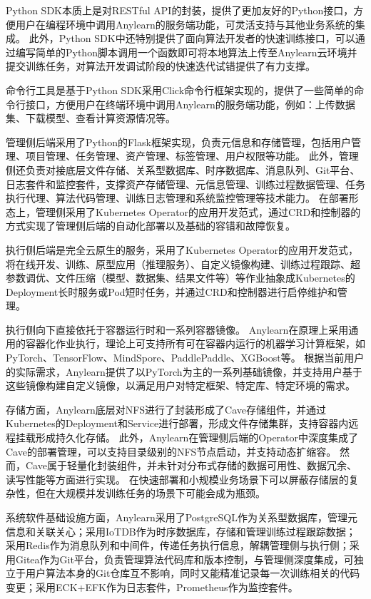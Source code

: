 Python SDK本质上是对RESTful API的封装，提供了更加友好的Python接口，方便用户在编程环境中调用Anylearn的服务端功能，可灵活支持与其他业务系统的集成。
此外，Python SDK中还特别提供了面向算法开发者的快速训练接口，可以通过编写简单的Python脚本调用一个函数即可将本地算法上传至Anylearn云环境并提交训练任务，对算法开发调试阶段的快速迭代试错提供了有力支撑。

命令行工具是基于Python SDK采用Click命令行框架实现的，提供了一些简单的命令行接口，方便用户在终端环境中调用Anylearn的服务端功能，例如：上传数据集、下载模型、查看计算资源情况等。

管理侧后端采用了Python的Flask框架实现，负责元信息和存储管理，包括用户管理、项目管理、任务管理、资产管理、标签管理、用户权限等功能。
此外，管理侧还负责对接底层文件存储、关系型数据库、时序数据库、消息队列、Git平台、日志套件和监控套件，支撑资产存储管理、元信息管理、训练过程数据管理、任务执行代理、算法代码管理、训练日志管理和系统监控管理等技术能力。
在部署形态上，管理侧采用了Kubernetes Operator的应用开发范式，通过CRD和控制器的方式实现了管理侧后端的自动化部署以及基础的容错和故障恢复。

执行侧后端是完全云原生的服务，采用了Kubernetes Operator的应用开发范式，将在线开发、训练、原型应用（推理服务）、自定义镜像构建、训练过程跟踪、超参数调优、文件压缩（模型、数据集、结果文件等）等作业抽象成Kubernetes的Deployment长时服务或Pod短时任务，并通过CRD和控制器进行启停维护和管理。

执行侧向下直接依托于容器运行时和一系列容器镜像。
Anylearn在原理上采用通用的容器化作业执行，理论上可支持所有可在容器内运行的机器学习计算框架，如PyTorch、TensorFlow、MindSpore、PaddlePaddle、XGBoost等。
根据当前用户的实际需求，Anylearn提供了以PyTorch为主的一系列基础镜像，并支持用户基于这些镜像构建自定义镜像，以满足用户对特定框架、特定库、特定环境的需求。

存储方面，Anylearn底层对NFS进行了封装形成了Cave存储组件，并通过Kubernetes的Deployment和Service进行部署，形成文件存储集群，支持容器内远程挂载形成持久化存储。
此外，Anylearn在管理侧后端的Operator中深度集成了Cave的部署管理，可以支持目录级别的NFS节点启动，并支持动态扩缩容。
然而，Cave属于轻量化封装组件，并未针对分布式存储的数据可用性、数据冗余、读写性能等方面进行实现。
在快速部署和小规模业务场景下可以屏蔽存储层的复杂性，但在大规模并发训练任务的场景下可能会成为瓶颈。

系统软件基础设施方面，Anylearn采用了PostgreSQL作为关系型数据库，管理元信息和关联关心；采用IoTDB作为时序数据库，存储和管理训练过程跟踪数据；采用Redis作为消息队列和中间件，传递任务执行信息，解耦管理侧与执行侧；采用Gitea作为Git平台，负责管理算法代码库和版本控制，与管理侧深度集成，可独立于用户算法本身的Git仓库互不影响，同时又能精准记录每一次训练相关的代码变更；采用ECK+EFK作为日志套件，Prometheus作为监控套件。


